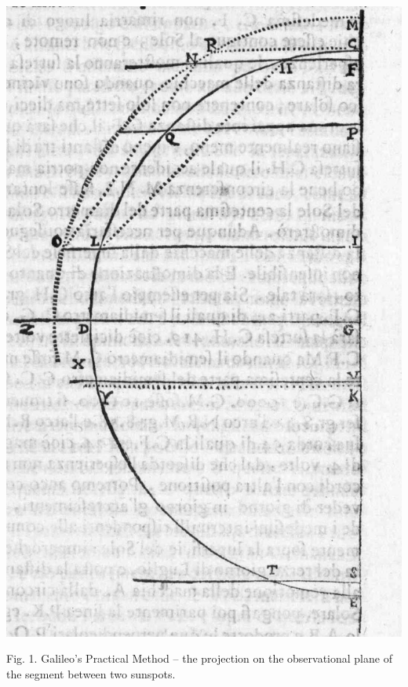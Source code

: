 \documentclass[a4paper]{article}
\begin{document}
{\centering  \includegraphics{Sierotowiczorg-img001.jpg} \par}
{\centering
Fig. 1. Galileo’s Practical Method – the projection on the observational plane of the segment between two sunspots. 
\par}
\end{document}
